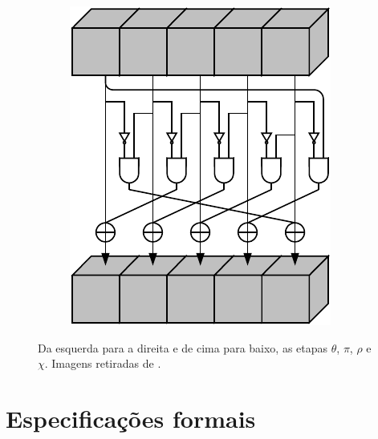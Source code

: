 \documentclass{article}
\begin{document}
\begin{itemize}
\begin{figure}[H]
\begin{subfigure}{.5\textwidth}
    \end{subfigure}%
    \begin{subfigure}{.5\textwidth}
        \centering
        \includegraphics[scale=0.65]{chi_step}
    \end{subfigure}
    \caption{Da esquerda para a direita e de cima para baixo, as etapas
    $\theta$, $\pi$, $\rho$ e $\chi$. Imagens retiradas de
    \cite{KeccakReference}.}
    \label{fig:steps}
\end{figure}

\end{itemize}

\section{Especificações formais}
\end{document}

